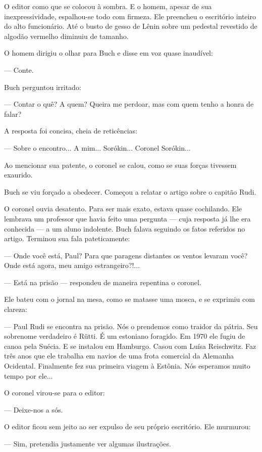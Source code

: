 O editor como que se colocou à sombra. E o homem, apesar de sua
inexpressividade, espalhou-se todo com firmeza. Ele preencheu o
escritório inteiro do alto funcionário. Até o busto de gesso de Lênin
sobre um pedestal revestido de algodão vermelho diminuiu de tamanho.

O homem dirigiu o olhar para Buch e disse em voz quase inaudível:

--- Conte.

Buch perguntou irritado:

--- Contar o quê? A quem? Queira me perdoar, mas com quem tenho a honra
de falar?

A resposta foi concisa, cheia de reticências:

--- Sobre o encontro... A mim... Sorókin... Coronel Sorókin...

Ao mencionar sua patente, o coronel se calou, como se suas forças
tivessem exaurido.

Buch se viu forçado a obedecer. Começou a relatar o artigo sobre o
capitão Rudi.

O coronel ouvia desatento. Para ser mais exato, estava quase cochilando.
Ele lembrava um professor que havia feito uma pergunta --- cuja resposta
já lhe era conhecida --- a um aluno indolente. Buch falava seguindo os
fatos referidos no artigo. Terminou sua fala pateticamente:

--- Onde você está, Paul? Para que paragens distantes os ventos levaram
você? Onde está agora, meu amigo estrangeiro?!...

--- Está na prisão --- respondeu de maneira repentina o coronel.

Ele bateu com o jornal na mesa, como se matasse uma mosca, e se exprimiu
com clareza:

--- Paul Rudi se encontra na prisão. Nós o prendemos como traidor da
pátria. Seu sobrenome verdadeiro é Rütti. É um estoniano foragido. Em
1970 ele fugiu de canoa pela Suécia. E se instalou em Hamburgo. Casou
com Luísa Reischwitz. Faz três anos que ele trabalha em navios de uma
frota comercial da Alemanha Ocidental. Finalmente fez sua primeira
viagem à Estônia. Nós esperamos muito tempo por ele...

O coronel virou-se para o editor:

--- Deixe-nos a sós.

O editor ficou sem jeito ao ser expulso de seu próprio escritório. Ele
murmurou:

--- Sim, pretendia justamente ver algumas ilustrações.

